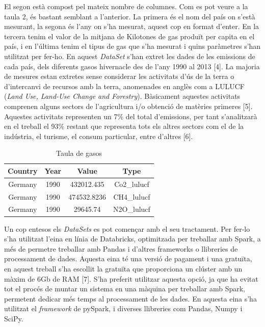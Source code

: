 \documentclass[10pt,a4paper,twocolumn,twoside]{article}
\begin{document}
El segon està compost pel mateix nombre de columnes. Com es pot veure a la taula 2, és bastant semblant a l'anterior. La primera és el nom del país on s'està mesurant, la segona és l'any on s'ha mesurat, aquest cop en format d'enter. En la tercera tenim el valor de la mitjana de Kilotones de gas produït per capita en el país, i en l'última tenim el tipus de gas que s'ha mesurat i quins paràmetres s'han utilitzat per fer-ho. En aquest \textit{DataSet} s'han extret les dades de les emissions de cada país, dels diferents gasos hivernacle des de l'any 1990 al 2013 [4]. La majoria de mesures estan extretes sense considerar les activitats d'ús de la terra o d'intercanvi de recursos amb la terra, anomenades en anglès com a LULUCF (\textit{Land Use, Land-Use Change and Forestry}). Bàsicament aquestes activitats comprenen alguns sectors de l'agricultura i/o obtenció de matèries primeres [5]. Aquestes activitats representen un 7\% del total d'emissions, per tant s'analitzarà en el treball el 93\% restant que representa tots els altres sectors com el de la indústria, el turisme, el consum particular, entre d'altres [6].
\begin{table}[th]
\caption{Taula de gasos}
\begin{center}
\begin{tabular}{c c c c} %
\hline\hline %
Country & Year & Value & Type \\
\hline
Germany & 1990 & 432012.435 & Co2\_lulucf \\
Germany & 1990 & 474532.8236 & CH4\_lulucf \\
Germany & 1990 & 29645.74 & N2O\_lulucf \\
\hline
\end{tabular}
\end{center}
\end{table}

Un cop entesos els \textit{DataSets} es pot començar amb el seu tractament. Per fer-lo s'ha utilitzat l'eina en línia de Databricks, optimitzada per treballar amb Spark, a més de permetre treballar amb Pandas i d'altres frameworks o llibreries de processament de dades. Aquesta eina té una versió de pagament i una gratuïta, en aquest treball s'ha escollit la gratuïta que proporciona un clúster amb un màxim de 6Gb de RAM [7]. S'ha preferit utilitzar aquesta opció, ja que ha evitat tot el procés de muntar un sistema en una màquina per treballar amb Spark, permetent dedicar més temps al processament de les dades. En aquesta eina s'ha utilitzat el \textit{framework} de pySpark, i diverses llibreries com Pandas, Numpy i SciPy.
\end{document}
